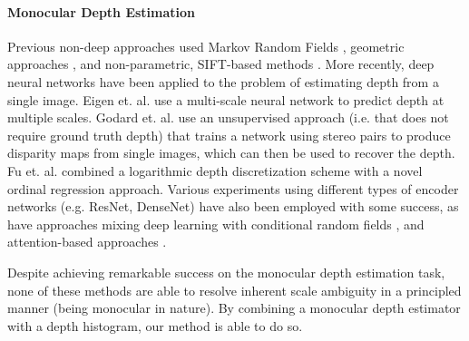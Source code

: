 

\paragraph{Monocular Depth Estimation}
Previous non-deep approaches used Markov Random Fields \cite{Saxena2006},
geometric approaches \cite{Hoiem2005}, and non-parametric, SIFT-based methods
\cite{Karsch2014}.
More recently, deep neural networks have been applied to the problem of estimating depth from a
single image. Eigen et. al. \cite{Eigen2014} use a multi-scale neural network to
predict depth at multiple scales. Godard et. al. \cite{Godard2017} use an
unsupervised approach (i.e. that does not require ground truth depth) that
trains a network using stereo pairs to produce disparity maps from
single images, which can then be used to recover the depth. Fu et. al.
\cite{Fu2018} combined a logarithmic depth discretization scheme with a novel
ordinal regression approach. Various experiments using different types of
encoder networks (e.g. ResNet, DenseNet) \cite{Laina2016} \cite{Alhashim2018}
have also been employed with some success, as have approaches mixing deep
learning with conditional random fields \cite{Xu2017}, and attention-based
approaches \cite{Xu2018} \cite{Hao2018}.

Despite achieving remarkable success on the monocular depth estimation task, none of these methods are able to
resolve inherent scale ambiguity in a principled manner (being monocular in nature). By combining a monocular
depth estimator with a depth histogram, our method is able to do so.


